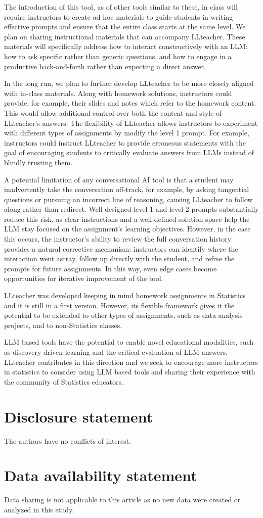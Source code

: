 \documentclass[
  12pt]{article}
\begin{document}
The introduction of this tool, as of other tools similar to these, in class will require instructors to create ad-hoc materials to guide students in writing effective prompts and ensure that the entire class starts at the same level. We plan on sharing instructional materials that can accompany LLteacher. These materials will specifically address how to interact constructively with an LLM: how to ask specific rather than generic questions, and how to engage in a productive back-and-forth rather than expecting a direct answer.

In the long run, we plan to further develop LLteacher to be more closely aligned with in-class materials. 
Along with homework solutions, instructors could provide, for example, their slides and notes which refer to the homework content. This would allow additional control over both the content and style of LLteacher's answers. 
The flexibility of LLteacher allows instructors to experiment with different types of assignments by modify the level 1 prompt. 
For example, instructors could instruct LLteacher to provide erroneous statements with the goal of encouraging students to critically evaluate answers from LLMs instead of blindly trusting them. 

A potential limitation of any conversational AI tool is that a student may inadvertently take the conversation off-track, for example, by asking tangential questions or pursuing an incorrect line of reasoning, causing LLteacher to follow along rather than redirect. Well-designed level 1 and level 2 prompts substantially reduce this risk, as clear instructions and a  well-defined solution space help the LLM stay focused on the assignment's  learning objectives. 
However, in the case this occurs, the instructor's ability to review the full conversation history provides a natural corrective  mechanism: instructors can identify where the interaction went astray, follow up directly with the student, and refine the prompts for future assignments.
In this way, even edge cases become opportunities for iterative improvement of the tool.

LLteacher was developed keeping in mind homework assignments in Statistics and it is still in a first version. However, its flexible framework gives it the potential to be extended to other types of assignments, such as data analysis projects, and to non-Statistics classes. 

LLM based tools have the potential to enable novel educational modalities, such as discovery-driven learning and the critical evaluation of LLM answers.
LLteacher contributes in this direction and we seek to encourage more instructors in statistics to consider using LLM based tools and sharing their experience with the community of Statistics educators.

\section{Disclosure statement}\label{disclosure-statement}

The authors have no conflicts of interest.

\section{Data availability statement}

Data sharing is not applicable to this article as no new data were created or
analyzed in this study.


\end{document}

